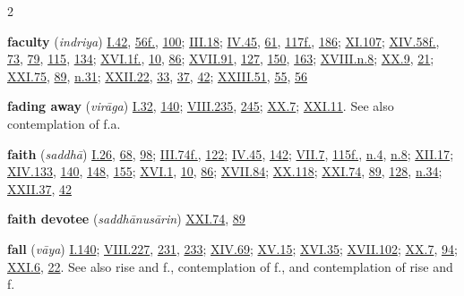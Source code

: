 \begin{multicols}{2}
\begin{vismHanging}
\par\textbf{faculty} (\emph{indriya}) \hyperlink{I.42}{I.42}{}, \hyperlink{I.56}{56f.}{}, \hyperlink{I.100}{100}{}; \hyperlink{III.18}{III.18}{}; \hyperlink{IV.45}{IV.45}{}, \hyperlink{IV.61}{61}{}, \hyperlink{IV.117}{117f.}{}, \hyperlink{IV.186}{186}{}; \hyperlink{XI.107}{XI.107}{}; \hyperlink{XIV.58}{XIV.58f.}{}, \hyperlink{XIV.73}{73}{}, \hyperlink{XIV.79}{79}{}, \hyperlink{XIV.115}{115}{}, \hyperlink{XIV.134}{134}{}; \hyperlink{XVI.1}{XVI.1f.}{}, \hyperlink{XVI.10}{10}{}, \hyperlink{XVI.86}{86}{}; \hyperlink{XVII.91}{XVII.91}{}, \hyperlink{XVII.127}{127}{}, \hyperlink{XVII.150}{150}{}, \hyperlink{XVII.163}{163}{}; \hyperlink{XVIII.n8}{XVIII.n.8}{}; \hyperlink{XX.9}{XX.9}{}, \hyperlink{XX.21}{21}{}; \hyperlink{XXI.75}{XXI.75}{}, \hyperlink{XXI.89}{89}{}, \hyperlink{XXI.n31}{n.31}{}; \hyperlink{XXII.22}{XXII.22}{}, \hyperlink{XXII.33}{33}{}, \hyperlink{XXII.37}{37}{}, \hyperlink{XXII.42}{42}{}; \hyperlink{XXIII.51}{XXIII.51}{}, \hyperlink{XXIII.55}{55}{}, \hyperlink{XXIII.56}{56}{}
\par\textbf{fading away} (\emph{virāga}) \hyperlink{I.32}{I.32}{}, \hyperlink{I.140}{140}{}; \hyperlink{VIII.235}{VIII.235}{}, \hyperlink{VIII.245}{245}{}; \hyperlink{XX.7}{XX.7}{}; \hyperlink{XXI.11}{XXI.11}{}. See also contemplation of f.a. 
\par\textbf{faith} (\emph{saddhā}) \hyperlink{I.26}{I.26}{}, \hyperlink{I.68}{68}{}, \hyperlink{I.98}{98}{}; \hyperlink{III.74}{III.74f.}{}, \hyperlink{III.122}{122}{}; \hyperlink{IV.45}{IV.45}{}, \hyperlink{IV.142}{142}{}; \hyperlink{VII.7}{VII.7}{}, \hyperlink{VII.115}{115f.}{}, \hyperlink{VII.n4}{n.4}{}, \hyperlink{VII.n8}{n.8}{}; \hyperlink{XII.17}{XII.17}{}; \hyperlink{XIV.133}{XIV.133}{}, \hyperlink{XIV.140}{140}{}, \hyperlink{XIV.148}{148}{}, \hyperlink{XIV.155}{155}{}; \hyperlink{XVI.1}{XVI.1}{}, \hyperlink{XVI.10}{10}{}, \hyperlink{XVI.86}{86}{}; \hyperlink{XVII.84}{XVII.84}{}; \hyperlink{XX.118}{XX.118}{}; \hyperlink{XXI.74}{XXI.74}{}, \hyperlink{XXI.89}{89}{}, \hyperlink{XXI.128}{128}{}, \hyperlink{XXI.n34}{n.34}{}; \hyperlink{XXII.37}{XXII.37}{}, \hyperlink{XXII.42}{42}{}
\par\textbf{faith devotee} (\emph{saddhānusārin}) \hyperlink{XXI.74}{XXI.74}{}, \hyperlink{XXI.89}{89}{}
\par\textbf{fall} (\emph{vāya}) \hyperlink{I.140}{I.140}{}; \hyperlink{VIII.227}{VIII.227}{}, \hyperlink{VIII.231}{231}{}, \hyperlink{VIII.233}{233}{}; \hyperlink{XIV.69}{XIV.69}{}; \hyperlink{XV.15}{XV.15}{}; \hyperlink{XVI.35}{XVI.35}{}; \hyperlink{XVII.102}{XVII.102}{}; \hyperlink{XX.7}{XX.7}{}, \hyperlink{XX.94}{94}{}; \hyperlink{XXI.6}{XXI.6}{}, \hyperlink{XXI.22}{22}{}. See also rise and f., contemplation of f., and contemplation of rise and f. 

\end{vismHanging}
\end{multicols}
